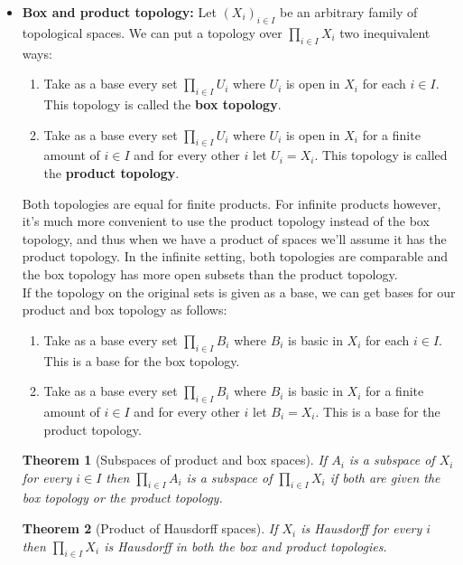 \documentclass[a4paper]{article}
\newtheorem{theorem}{Theorem}[section]
\begin{document}
\begin{itemize}
\item
\textbf{Box and product topology: }Let $(X_{i})_{i\in I}$ be an arbitrary family of topological spaces. We can put a topology over ${\displaystyle \prod_{i\in I}X_{i}}$ two inequivalent ways:
\begin{enumerate}
\item
Take as a base every set ${\displaystyle \prod_{i\in I}U_{i}}$ where $U_{i}$ is open in $X_{i}$ for each $i\in I$. This topology is called the \textbf{box topology}.
\item
Take as a base every set ${\displaystyle \prod_{i\in I}U_{i}}$ where $U_{i}$ is open in $X_{i}$ for a finite amount of $i\in I$ and for every other $i$ let $U_{i}=X_{i}$. This topology is called the \textbf{product topology}.
\end{enumerate}
Both topologies are equal for finite products. For infinite products however, it's much more convenient to use the product topology instead of the box topology, and thus when we have a product of spaces we'll assume it has the product topology. In the infinite setting, both topologies are comparable and the box topology has more open subsets than the product topology.\\
If the topology on the original sets is given as a base, we can get bases for our product and box topology as follows:
\begin{enumerate}
\item
Take as a base every set ${\displaystyle \prod_{i\in I}B_{i}}$ where $B_{i}$ is basic in $X_{i}$ for each $i\in I$. This is a base for the box topology.
\item
Take as a base every set ${\displaystyle \prod_{i\in I}B_{i}}$ where $B_{i}$ is basic in $X_{i}$ for a finite amount of $i\in I$ and for every other $i$ let $B_{i}=X_{i}$. This is a base for the product topology.
\end{enumerate}

\begin{theorem}[Subspaces of product and box spaces]
If $A_{i}$ is a subspace of $X_{i}$ for every $i\in I$ then ${\displaystyle \prod_{i\in I}A_{i} }$ is a subspace of ${\displaystyle \prod_{i\in I}X_{i} }$ if both are given the box topology or the product topology.
\end{theorem}

\begin{theorem}[Product of Hausdorff spaces]
If $X_{i}$ is Hausdorff for every $i$ then ${\displaystyle \prod_{i\in I}X_{i} }$ is Hausdorff in both the box and product topologies.
\end{theorem}


\end{itemize}
\end{document}
